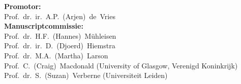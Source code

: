 \newpage%

\thispagestyle{empty}

\small{

\noindent\textbf{Promotor:}\\
Prof.\ dr.\ ir.\ A.P.\ (Arjen)\ de\ Vries\\
\newline
\noindent\textbf{Manuscriptcommissie:}\\
Prof.\ dr.\ H.F.\ (Hannes)\ Mühleisen\\
Prof.\ dr.\ ir.\ D.\ (Djoerd)\ Hiemstra\\
Prof.\ dr.\ M.A.\ (Martha)\ Larson\\
Prof.\ C.\ (Craig)\ Macdonald \hfill (University of Glasgow, Verenigd Koninkrijk)\\
Prof.\ dr.\ S.\ (Suzan)\ Verberne \hfill (Universiteit Leiden) \\

}
